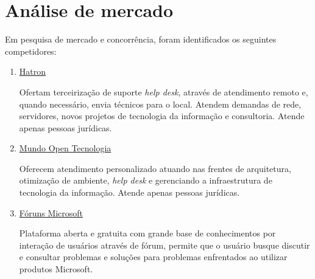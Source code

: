 \chapter[Análise de mercado]{Análise de mercado}

    Em pesquisa de mercado e concorrência, foram identificados os seguintes competidores:
    
    \begin{enumerate}
        \item 
        \href{https://hatron.com.br/}{Hatron}
        
        Ofertam terceirização de suporte \textit{help desk}, através de atendimento remoto e, quando necessário, envia técnicos para o local. Atendem demandas de rede, servidores, novos projetos de tecnologia da informação e consultoria. Atende apenas pessoas jurídicas.
        
        \item \href{https://www.mundoopen.com.br/helpdesk-para-empresas-sp-suporte-tecnico-em-ti.html}{Mundo Open Tecnologia}
        
        Oferecem atendimento personalizado atuando nas frentes de arquitetura, otimização de ambiente, \textit{help desk} e gerenciando a infraestrutura de tecnologia da informação. Atende apenas pessoas jurídicas.
        
        \item \href{https://answers.microsoft.com/pt-br?auth=1}{Fóruns Microsoft}
        
        Plataforma aberta e gratuita com grande base de conhecimentos por interação de usuários através de fórum, permite que o usuário busque discutir e consultar problemas e soluções para problemas enfrentados ao utilizar produtos Microsoft.
        
    \end{enumerate}

